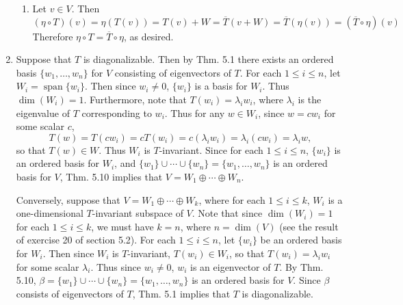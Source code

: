 \documentclass[12pt]{article}
\DeclareMathOperator{\spn}{span}
\begin{document}
\begin{enumerate}
\begin{enumerate}
\item
Let $v \in V$. Then
\begin{equation*}
(\eta \circ T)(v) = \eta(T(v)) = T(v) + W = \overline{T}(v + W) = \overline{T}(\eta(v)) = (\overline{T} \circ \eta)(v)
\end{equation*}
Therefore $\eta \circ T = \overline{T} \circ \eta$, as desired.

\end{enumerate}

\setcounter{enumi}{35}
\item
Suppose that $T$ is diagonalizable. Then by Thm. 5.1 there exists an ordered basis $\{w_1, \dots, w_n\}$ for $V$ consisting of eigenvectors of $T$. For each $1 \leq i \leq n$, let $W_i = \spn\{w_i\}$. Then since $w_i \neq 0$, $\{w_i\}$ is a basis for $W_i$. Thus $\dim(W_i) = 1$. Furthermore, note that $T(w_i) = \lambda_i w_i$, where $\lambda_i$ is the eigenvalue of $T$ corresponding to $w_i$. Thus for any $w \in W_i$, since $w = c w_i$ for some scalar $c$,
\begin{equation*}
T(w) = T(cw_i) = cT(w_i) = c(\lambda_i w_i) = \lambda_i (c w_i) = \lambda_i w,
\end{equation*}
so that $T(w) \in W$. Thus $W_i$ is $T$-invariant. Since for each $1 \leq i \leq n$, $\{w_i\}$ is an ordered basis for $W_i$, and $\{w_1\} \cup \cdots \cup \{w_n\} = \{w_1, \dots, w_n\}$ is an ordered basis for $V$, Thm. 5.10 implies that $V = W_1 \oplus \cdots \oplus W_n$.

Conversely, suppose that $V = W_1 \oplus \cdots \oplus W_k$, where for each $1 \leq i \leq k$, $W_i$ is a one-dimensional $T$-invariant subspace of $V$. Note that since $\dim(W_i) = 1$ for each $1 \leq i \leq k$, we must have $k = n$, where $n = \dim(V)$ (see the result of exercise 20 of section 5.2). For each $1 \leq i \leq n$, let $\{w_i\}$ be an ordered basis for $W_i$. Then since $W_i$ is $T$-invariant, $T(w_i) \in W_i$, so that $T(w_i) = \lambda_i w_i$ for some scalar $\lambda_i$. Thus since $w_i \neq 0$, $w_i$ is an eigenvector of $T$. By Thm. 5.10, $\beta = \{w_1\} \cup \cdots \cup \{w_n\} = \{w_1, \dots, w_n\}$ is an ordered basis for $V$. Since $\beta$ consists of eigenvectors of $T$, Thm. 5.1 implies that $T$ is diagonalizable.


\end{enumerate}
\end{document}

